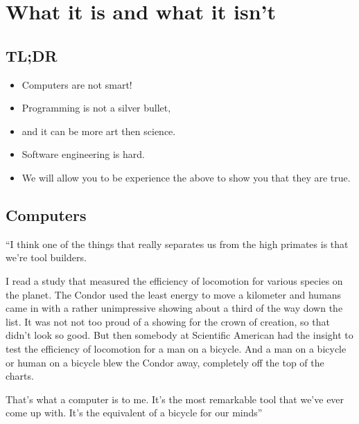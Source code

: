  

\chapter{What it is and what it isn't}

	\section*{TL;DR}
	
	\begin{itemize}
		\item Computers are not smart!
		\item Programming is not a silver bullet,
		\item and it can be more art then science.
		\item Software engineering is hard.
		\item We will allow you to be experience the above to show you that they are true.
	\end{itemize}
	\clearpage

	\section{Computers}
	
	``I think one of the things that really separates us from the high primates is that we're tool builders.

	I read a study that measured the efficiency of locomotion for various species on the planet.
	The Condor used the least energy to move a kilometer and humans came in with a rather unimpressive showing about a third of the way down the list.
	It was not not too proud of a showing for the crown of creation, so that didn't look so good.
	But then somebody at Scientific American had the insight to test the efficiency of locomotion for a man on a bicycle.
	And a man on a bicycle or human on a bicycle blew the Condor away, completely off the top of the charts.

	That's what a computer is to me.
	It's the most remarkable tool that we've ever come up with. 
	It's the equivalent of a bicycle for our minds''
	
